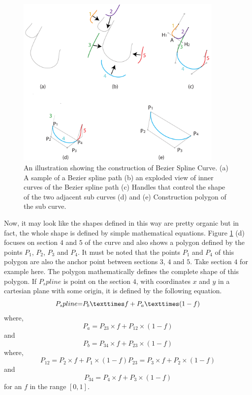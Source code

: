         \begin{figure}
          \centering
          \includegraphics[width=0.9\textwidth]{BezierSplineCurve.pdf}
          \caption{An illustration showing the construction of Bezier Spline Curve. (a) A sample of a Bezier spline path (b) an exploded view of inner curves of the Bezier spline path (c) Handles that control the shape of the two adjacent sub curves (d) and (e) Construction polygon of the sub curve.
          } \label{Fig:RotatingBezierSplines}
        \end{figure}

        Now, it may look like the shapes defined in this way are pretty organic but in fact, the whole shape is defined by simple mathematical equations. Figure \ref{Fig:RotatingBezierSplines} (d) focuses on section $4$ and $5$ of the curve and also shows a polygon defined by the points $P_1$, $P_2$, $P_3$ and  $P_4$. It must be noted that the points $P_1$ and $P_4$ of this polygon are also the anchor point between sections $3$, $4$ and $5$. Take section $4$ for example here. The polygon mathematically defines the complete shape of this polygon. If $P_spline$ is point on the section $4$, with coordinates $x$ and $y$ in a cartesian plane with some origin, it is defined by the following equation.
         \begin{equation}
         P_spline$$=$$P_b×f+P_a×(1 -f)
         \end{equation}
where,
\begin{equation}
P_a=P_23×f+P_12×(1 -f)
\end{equation}
and
\begin{equation}
P_b=P_34×f+P_23×(1 -f)
\end{equation}
where,
\begin{equation}
P_12=P_2×f+P_1×(1 -f)
P_23=P_3×f+P_2×(1 -f)
\end{equation}
and
\begin{equation}
P_34=P_4×f+P_3×(1 -f)
\end{equation}
for an $f$ in the range $[0, 1]$.

